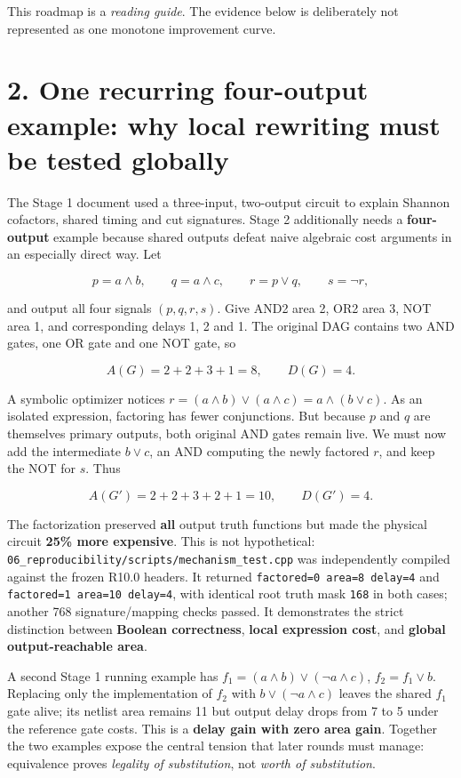 \documentclass[a4paper,10pt]{article}
\theoremstyle{definition}
\theoremstyle{remark}
\begin{document}
This roadmap is a \emph{reading guide}. The evidence below is deliberately not represented as one monotone improvement curve.

\section{2. One recurring four-output example: why local rewriting must be tested globally}\label{one-recurring-four-output-example-why-local-rewriting-must-be-tested-globally}

The Stage 1 document used a three-input, two-output circuit to explain Shannon cofactors, shared timing and cut signatures. Stage 2 additionally needs a \textbf{four-output} example because shared outputs defeat naive algebraic cost arguments in an especially direct way. Let

\[
p=a\land b,\qquad q=a\land c,\qquad r=p\lor q,\qquad s=\neg r,
\]

and output all four signals \((p,q,r,s)\). Give AND2 area 2, OR2 area 3, NOT area 1, and corresponding delays 1, 2 and 1. The original DAG contains two AND gates, one OR gate and one NOT gate, so

\[
A(G)=2+2+3+1=8, \qquad D(G)=4.
\]

A symbolic optimizer notices \(r=(a\land b)\lor(a\land c)=a\land(b\lor c)\). As an isolated expression, factoring has fewer conjunctions. But because \(p\) and \(q\) are themselves primary outputs, both original AND gates remain live. We must now add the intermediate \(b\lor c\), an AND computing the newly factored \(r\), and keep the NOT for \(s\). Thus

\[
A(G')=2+2+3+2+1=10,\qquad D(G')=4.
\]

The factorization preserved \textbf{all} output truth functions but made the physical circuit \textbf{25\% more expensive}. This is not hypothetical: \texttt{06\_reproducibility/scripts/mechanism\_test.cpp} was independently compiled against the frozen R10.0 headers. It returned \texttt{factored=0\ area=8\ delay=4} and \texttt{factored=1\ area=10\ delay=4}, with identical root truth mask \texttt{168} in both cases; another 768 signature/mapping checks passed. It demonstrates the strict distinction between \textbf{Boolean correctness}, \textbf{local expression cost}, and \textbf{global output-reachable area}.

A second Stage 1 running example has \(f_1=(a\land b)\lor(\neg a\land c)\), \(f_2=f_1\lor b\). Replacing only the implementation of \(f_2\) with \(b\lor(\neg a\land c)\) leaves the shared \(f_1\) gate alive; its netlist area remains 11 but output delay drops from 7 to 5 under the reference gate costs. This is a \textbf{delay gain with zero area gain}. Together the two examples expose the central tension that later rounds must manage: equivalence proves \emph{legality of substitution}, not \emph{worth of substitution}.
\end{document}
